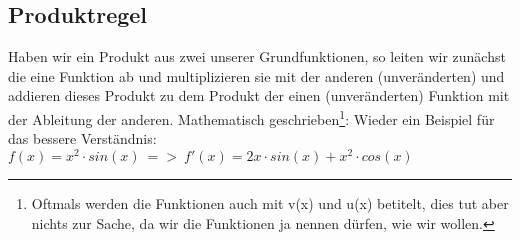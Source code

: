 \subsection{Produktregel}
	Haben wir ein Produkt aus zwei unserer Grundfunktionen, so leiten wir zunächst
	die eine Funktion ab und multiplizieren sie mit der anderen (unveränderten) und
	addieren dieses Produkt zu dem Produkt der einen (unveränderten) Funktion mit
	der Ableitung der anderen. Mathematisch geschrieben\footnote{Oftmals werden die
	Funktionen auch mit v(x) und u(x) betitelt, dies tut aber nichts zur Sache, da
	wir die Funktionen ja nennen dürfen, wie wir wollen.}:
	\formel{\[h'(x)=(f(x)\cdot g(x))' = f'(x)\cdot g(x)+f(x)\cdot g'(x)\]}
	Wieder ein Beispiel für das bessere Verständnis: \(f(x)=x^2\cdot sin(x)\ =>\
	f'(x)=2x\cdot sin(x)+x^2\cdot cos(x)\)
	
